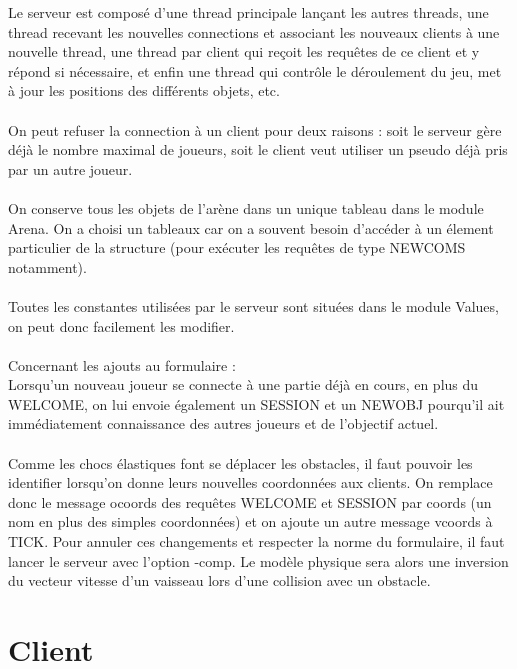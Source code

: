 \documentclass{article}
\begin{document}
Le serveur est composé d'une thread principale lançant les autres threads, une thread recevant les nouvelles connections et
associant les nouveaux clients à une nouvelle thread, une thread par client qui reçoit les requêtes de ce client et y répond si nécessaire,
et enfin une thread qui contrôle le déroulement du jeu, met à jour les positions des différents objets, etc.\\
\\
On peut refuser la connection à un client pour deux raisons : soit le serveur gère déjà le nombre maximal de joueurs, soit le client veut utiliser un
pseudo déjà pris par un autre joueur.\\
\\
On conserve tous les objets de l'arène dans un unique tableau dans le module Arena. On a choisi un tableaux car on a souvent besoin d'accéder à un
élement particulier de la structure (pour exécuter les requêtes de type NEWCOMS notamment).\\
\\
Toutes les constantes utilisées par le serveur sont situées dans le module Values, on peut donc facilement les modifier.\\
\\
Concernant les ajouts au formulaire :\\
Lorsqu'un nouveau joueur se connecte à une partie déjà en cours, en plus du WELCOME, on lui envoie également un SESSION et un NEWOBJ
pourqu'il ait immédiatement connaissance des autres joueurs et de l'objectif actuel.\\
\\
Comme les chocs élastiques font se déplacer les obstacles, il faut pouvoir les identifier lorsqu'on donne leurs nouvelles coordonnées aux clients.
On remplace donc le message ocoords des requêtes WELCOME et SESSION par coords (un nom en plus des simples coordonnées) et on ajoute un autre message
vcoords à TICK. Pour annuler ces changements et respecter la norme du formulaire, il faut lancer le serveur avec l'option -comp.
Le modèle physique sera alors une inversion du vecteur vitesse d'un vaisseau lors d'une collision avec un obstacle.

\section{Client}
\end{document}
